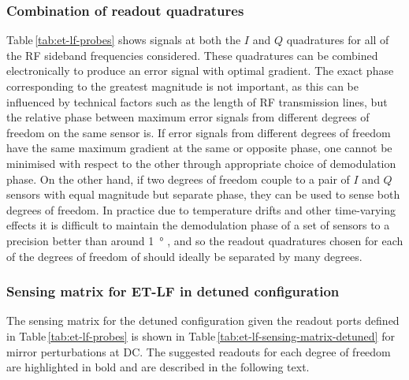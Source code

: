 \subsubsection{Combination of readout quadratures}
Table\,\ref{tab:et-lf-probes} shows signals at both the $I$ and $Q$ quadratures for all of the \gls{RF} sideband frequencies considered. These quadratures can be combined electronically to produce an error signal with optimal gradient. The exact phase corresponding to the greatest magnitude is not important, as this can be influenced by technical factors such as the length of \gls{RF} transmission lines, but the relative phase between maximum error signals from different degrees of freedom on the same sensor is. If error signals from different degrees of freedom have the same maximum gradient at the same or opposite phase, one cannot be minimised with respect to the other through appropriate choice of demodulation phase. On the other hand, if two degrees of freedom couple to a pair of $I$ and $Q$ sensors with equal magnitude but separate phase, they can be used to sense both degrees of freedom. In practice due to temperature drifts and other time-varying effects it is difficult to maintain the demodulation phase of a set of sensors to a precision better than around \SI{1}{\degree} \cite{Effler2014}, and so the readout quadratures chosen for each of the degrees of freedom of \ETLF{} should ideally be separated by many degrees.

\subsubsection{Sensing matrix for ET-LF in detuned configuration}
The sensing matrix for the detuned configuration given the readout ports defined in Table\,\ref{tab:et-lf-probes} is shown in Table\,\ref{tab:et-lf-sensing-matrix-detuned} for mirror perturbations at \gls{DC}. The suggested readouts for each degree of freedom are highlighted in bold and are described in the following text.

